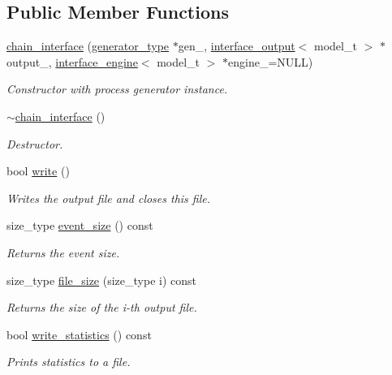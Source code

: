 \subsection*{Public Member Functions}
\begin{DoxyCompactItemize}
\item 
\hypertarget{a00060_ac6944448a45f1281886b040b50287b8b}{}\hyperlink{a00060_ac6944448a45f1281886b040b50287b8b}{chain\+\_\+interface} (\hyperlink{a00451}{generator\+\_\+type} $\ast$gen\+\_\+, \hyperlink{a00319}{interface\+\_\+output}$<$ model\+\_\+t $>$ $\ast$output\+\_\+, \hyperlink{a00318}{interface\+\_\+engine}$<$ model\+\_\+t $>$ $\ast$engine\+\_\+=N\+U\+L\+L)\label{a00060_ac6944448a45f1281886b040b50287b8b}

\begin{DoxyCompactList}\small\item\em Constructor with process generator instance. \end{DoxyCompactList}\item 
\hypertarget{a00060_aedbfe0b70fa152c87c06b87d653bfba0}{}\hyperlink{a00060_aedbfe0b70fa152c87c06b87d653bfba0}{$\sim$chain\+\_\+interface} ()\label{a00060_aedbfe0b70fa152c87c06b87d653bfba0}

\begin{DoxyCompactList}\small\item\em Destructor. \end{DoxyCompactList}\item 
bool \hyperlink{a00060_ab02f54cbb2cf5ec5d477fbdd08f9df76}{write} ()
\begin{DoxyCompactList}\small\item\em Writes the output file and closes this file. \end{DoxyCompactList}\item 
\hypertarget{a00060_aa9195022d17d5b78774251d9f1ccca17}{}size\+\_\+type \hyperlink{a00060_aa9195022d17d5b78774251d9f1ccca17}{event\+\_\+size} () const \label{a00060_aa9195022d17d5b78774251d9f1ccca17}

\begin{DoxyCompactList}\small\item\em Returns the event size. \end{DoxyCompactList}\item 
\hypertarget{a00060_abad8625cf7fb9ab53d520e7e60f6f555}{}size\+\_\+type \hyperlink{a00060_abad8625cf7fb9ab53d520e7e60f6f555}{file\+\_\+size} (size\+\_\+type i) const \label{a00060_abad8625cf7fb9ab53d520e7e60f6f555}

\begin{DoxyCompactList}\small\item\em Returns the size of the i-\/th output file. \end{DoxyCompactList}\item 
\hypertarget{a00060_ace62e874a6f3da373b49c197d3998aae}{}bool \hyperlink{a00060_ace62e874a6f3da373b49c197d3998aae}{write\+\_\+statistics} () const \label{a00060_ace62e874a6f3da373b49c197d3998aae}

\begin{DoxyCompactList}\small\item\em Prints statistics to a file. \end{DoxyCompactList}\end{DoxyCompactItemize}
